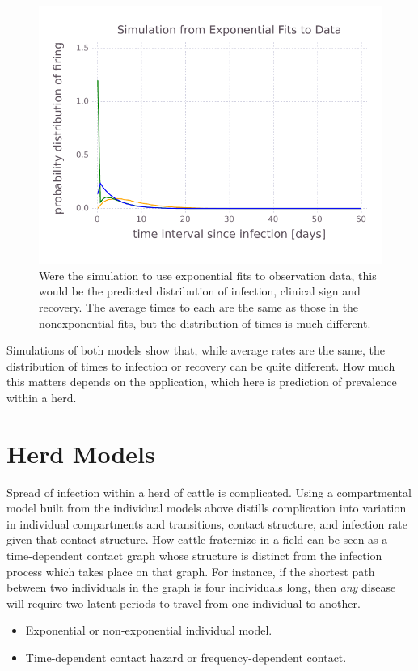 \documentclass{article}
\begin{document}
\begin{figure}
\centerline{\includegraphics{SimulationfromExponentialFitstoData}}
\caption{Were the simulation to use exponential fits to observation
data, this would be the predicted distribution of infection,
clinical sign and recovery. The average times to each are the same
as those in the nonexponential fits, but the distribution of
times is much different.
\label{fig:individualexponential}}
\end{figure}
Simulations of both models show that, while average rates
are the same, the distribution
of times to infection or recovery can be quite different.
How much this matters depends on the application, which
here is prediction of prevalence within a herd.

\section{Herd Models}
Spread of infection within a herd of cattle is complicated.
Using a compartmental model built from the individual
models above distills complication into variation in
individual compartments and transitions, contact structure,
and infection rate given that contact structure.
How cattle fraternize in a field can be seen as a
time-dependent contact graph whose structure is 
distinct from the infection process which takes place
on that graph. For instance, if the shortest path between
two individuals in the graph is four individuals long, then
\emph{any\/} disease will require two latent periods
to travel from one individual to another.

\begin{itemize}
  \item Exponential or non-exponential individual model.
  \item Time-dependent contact hazard or frequency-dependent contact.
\end{itemize}



\end{document}
